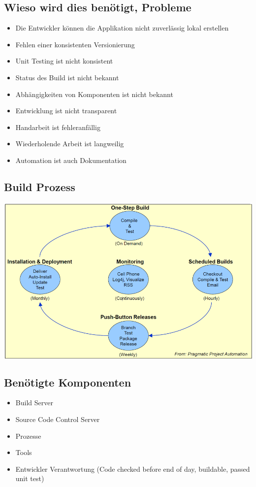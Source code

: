 \documentclass[10pt]{article}
\begin{document}
    \subsection{Wieso wird dies ben\"otigt, Probleme}
    \begin{itemize}
        \item Die Entwickler k\"onnen die Applikation nicht zuverl\"assig lokal erstellen
        \item Fehlen einer konsistenten Versionierung
        \item Unit Testing ist nicht konsistent
        \item Status des Build ist nicht bekannt
        \item Abh\"angigkeiten von Komponenten ist nicht bekannt
        \item Entwicklung ist nicht transparent
        \item Handarbeit ist fehleranf\"allig
        \item Wiederholende Arbeit ist langweilig
        \item Automation ist auch Dokumentation
    \end{itemize}

    \subsection{Build Prozess}
    \begin{center}
    	\includegraphics[scale=0.6]{assets/buildprozess.png}
    \end{center}
    
    \subsection{Ben\"otigte Komponenten}
    \begin{itemize}
        \item Build Server
        \item Source Code Control Server
        \item Prozesse
        \item Tools
        \item Entwickler Verantwortung (Code checked before end of day, buildable, passed unit test)
    \end{itemize}
\end{document}
